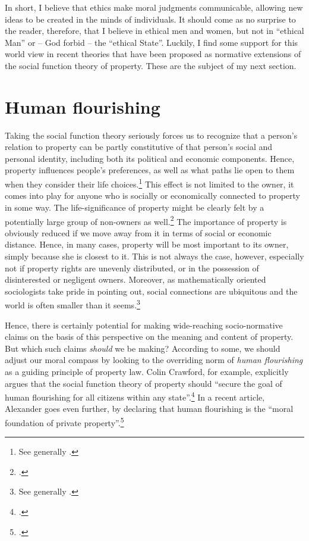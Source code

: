 \documentclass[12pt,a4paper]{book} %
\begin{document}
In short, I believe that ethics make moral judgments communicable, allowing new ideas to be created in the minds of individuals. It should come as no surprise to the reader, therefore, that I believe in ethical men and women, but not in ``ethical Man'' or -- God forbid --  the ``ethical State''. Luckily, I find some support for this world view in recent theories that have been proposed as normative extensions of the social function theory of property. These are the subject of my next section.

\section{Human flourishing}\label{sec:hf}

Taking the social function theory seriously forces us to recognize that a person's relation to property can be partly constitutive of that person's social and personal identity, including both its political and economic components. Hence, property influences people's preferences, as well as what paths lie open to them when they consider their life choices.\footnote{See generally \cite{alexander09}.} This effect is not limited to the owner, it comes into play for anyone who is socially or economically connected to property in some way. The life-significance of property might be clearly felt by a potentially large group of non-owners as well.\footcite[128-129]{alexander09d} The importance of property is obviously reduced if we move away from it in terms of social or economic distance. Hence, in many cases, property will be most important to its owner, simply because she is closest to it. This is not always the case, however, especially not if property rights are unevenly distributed, or in the possession of disinterested or negligent owners. Moreover, as mathematically oriented sociologists take pride in pointing out, social connections are ubiquitous  and the world is often smaller than it seems.\footnote{See generally \cite{schnettler09}.}

Hence, there is certainly potential for making wide-reaching socio-normative claims on the basis of this perspective on the meaning and content of property. But which such claims {\it should} we be making? According to some, we should adjust our moral compass by looking to the overriding norm of {\it human flourishing} as a guiding principle of property law. Colin Crawford, for example, explicitly argues that the social function theory of property should ``secure the goal of human flourishing for all citizens within any state''.\footcite[1089]{crawford11} In a recent article, Alexander goes even further, by declaring that human flourishing is the ``moral foundation of private property''.\footcite[1261]{alexander14} 
\end{document}
